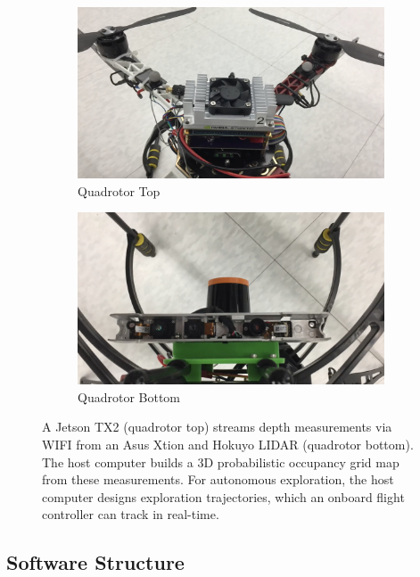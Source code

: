 \documentclass[smallextended]{svjour3}       %
\begin{document}
\begin{figure}[!t]
\centering
    	\begin{subfigure}[t]{0.44\columnwidth}
           	\centering
          	\includegraphics[width=\textwidth]{quad_top.png}
        		\caption{Quadrotor Top}
    	\end{subfigure}
	\hspace*{0.05\columnwidth}
    	\begin{subfigure}[t]{0.44\columnwidth}
           	\centering
          	\includegraphics[width=\textwidth]{quad_bottom.png}
        		\caption{Quadrotor Bottom}
    	\end{subfigure}
	\caption{A Jetson TX2 (quadrotor top) streams depth measurements via WIFI from an Asus Xtion and Hokuyo LIDAR (quadrotor bottom). The host computer builds a 3D probabilistic occupancy grid map from these measurements. For autonomous exploration, the host computer designs exploration trajectories, which an onboard flight controller can track in real-time.}
	\label{fig:QuadrotorHardware}
\end{figure}

\subsection{Software Structure}
\end{document}
